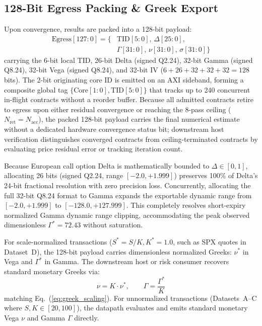 \documentclass[sigconf,anonymous,review]{acmart}
\begin{document}
\subsection{128-Bit Egress Packing \& Greek Export}
Upon convergence, results are packed into a 128-bit payload:
\begin{equation}
\begin{aligned}
    \text{Egress}[127:0] = \{ &\text{TID}[5:0],\, \Delta[25:0], \\
    &\Gamma[31:0],\, \nu[31:0],\, \sigma[31:0] \}
\end{aligned}
    \label{eq:egress_pack}
\end{equation}
carrying the 6-bit local TID, 26-bit Delta (signed Q2.24), 32-bit Gamma (signed Q8.24), 32-bit Vega (signed Q8.24), and 32-bit IV ($6 + 26 + 32 + 32 + 32 = 128$ bits). The 2-bit originating core ID is emitted on an AXI sideband, forming a composite global tag $\{\text{Core}[1:0], \text{TID}[5:0]\}$ that tracks up to 240 concurrent in-flight contracts without a reorder buffer. Because all admitted contracts retire to egress upon either residual convergence or reaching the 8-pass ceiling ($N_{\text{ret}} = N_{\text{acc}}$), the packed 128-bit payload carries the final numerical estimate without a dedicated hardware convergence status bit; downstream host verification distinguishes converged contracts from ceiling-terminated contracts by evaluating price residual error or tracking iteration count.

Because European call option Delta is mathematically bounded to $\Delta \in [0, 1]$, allocating 26 bits (signed Q2.24, range $[-2.0, +1.999]$) preserves 100\% of Delta's 24-bit fractional resolution with zero precision loss. Concurrently, allocating the full 32-bit Q8.24 format to Gamma expands the exportable dynamic range from $[-2.0, +1.999]$ to $[-128.0, +127.999]$. This completely resolves short-expiry normalized Gamma dynamic range clipping, accommodating the peak observed dimensionless $\Gamma^* = 72.43$ without saturation.

For scale-normalized transactions ($S^* = S/K, K^* = 1.0$, such as SPX quotes in Dataset~D), the 128-bit payload carries dimensionless normalized Greeks: $\nu^*$ in Vega and $\Gamma^*$ in Gamma. The downstream host or risk consumer recovers standard monetary Greeks via:
\begin{equation}
    \nu = K \cdot \nu^*, \qquad \Gamma = \frac{\Gamma^*}{K}
    \label{eq:egress_recovery}
\end{equation}
matching Eq.~(\ref{eq:greek_scaling}). For unnormalized transactions (Datasets~A--C where $S, K \in [20, 100]$), the datapath evaluates and emits standard monetary Vega $\nu$ and Gamma $\Gamma$ directly.
\end{document}
